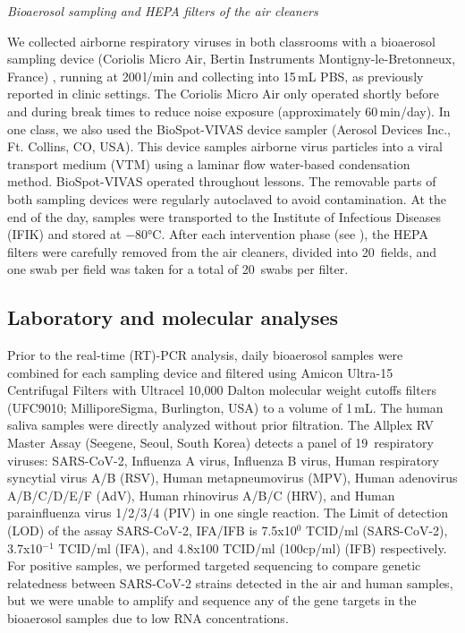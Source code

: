 \documentclass[fleqn,11pt]{wlscirep}
\begin{document}
\noindent \emph{Bioaerosol sampling and HEPA filters of the air cleaners} 

\noindent We collected airborne respiratory viruses in both classrooms with a bioaerosol sampling device (Coriolis Micro Air, Bertin Instruments Montigny-le-Bretonneux, France) , running at 200\,l/min and collecting into 15\,mL PBS, as previously reported in clinic settings\cite{Moore2021}. The Coriolis Micro Air only operated shortly before and during break times to reduce noise exposure (approximately 60\,min/day). In one class, we also used the BioSpot-VIVAS device sampler (Aerosol Devices Inc., Ft. Collins, CO, USA). This device samples airborne virus particles into a viral transport medium (VTM) using a laminar flow water-based condensation method\cite{Pan2016JAM,Lednicky2016AST}. BioSpot-VIVAS operated throughout lessons. The removable parts of both sampling devices were regularly autoclaved to avoid contamination. At the end of the day, samples were transported to the Institute of Infectious Diseases (IFIK) and stored at $-$80°C. After each intervention phase (see ), the HEPA filters were carefully removed from the air cleaners, divided into 20~fields, and one swab per field was taken for a total of 20~swabs per filter.\medskip

\subsection{Laboratory and molecular analyses}\label{sec:mol_analyses}

\noindent Prior to the real-time (RT)-PCR analysis, daily bioaerosol samples were combined for each sampling device and filtered using Amicon Ultra-15 Centrifugal Filters with Ultracel 10,000 Dalton molecular weight cutoffs filters (UFC9010; MilliporeSigma, Burlington, USA) to a volume of 1\,mL. The human saliva samples were directly analyzed without prior filtration. The Allplex RV Master Assay (Seegene, Seoul, South Korea) detects a panel of 19~respiratory viruses: SARS-CoV-2, Influenza A virus, Influenza B virus, Human respiratory syncytial virus A/B (RSV), Human metapneumovirus (MPV), Human adenovirus A/B/C/D/E/F (AdV), Human rhinovirus A/B/C (HRV), and Human parainfluenza virus 1/2/3/4 (PIV) in one single reaction. %
The Limit of detection (LOD) of the assay SARS-CoV-2, IFA/IFB is 7.5x10$^0$ TCID/ml (SARS-CoV-2), 3.7x10$^{-1}$ TCID/ml (IFA), and 4.8x100 TCID/ml (100cp/ml) (IFB) respectively.
For positive samples, we performed targeted sequencing to compare genetic relatedness between SARS-CoV-2 strains detected in the air and human samples\cite{Goncalves2021Microorganisms}, but we were unable to amplify and sequence any of the gene targets in the bioaerosol samples due to low RNA concentrations. 
\end{document}
